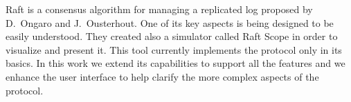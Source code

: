 Raft is a consensus algorithm for managing a replicated log proposed by D.~Ongaro and J.~Ousterhout.
One of its key aspects is being designed to be easily understood.
They created also a simulator called Raft Scope in order to visualize and present it.
This tool currently implements the protocol only in its basics.
In this work we extend its capabilities to support all the features
and we enhance the user interface to help clarify the more complex aspects of the protocol.
